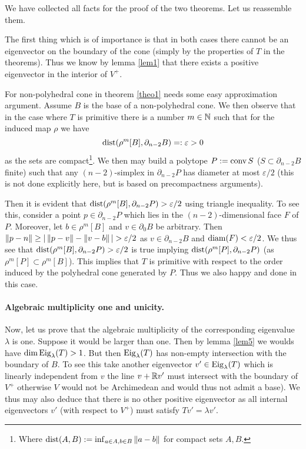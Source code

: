 \documentclass{article}
\begin{document}
We have collected all facts for the proof of the two theorems. Let us reassemble them.

The first thing which is of importance is that in both cases there cannot be an eigenvector on the boundary of the cone (simply by the properties of $T$ in the theorems). Thus we know by lemma \ref{lem1} that there exists a positive eigenvector in the interior of $V^+$. 

For non-polyhedral cone in theorem \ref{theo1} needs some easy approximation argument. Assume $B$ is the base of a non-polyhedral cone. We then observe that in the case where $T$ is primitive there is a number $m\in\mathbb{N}$ such that for the induced map $\rho$ we have 
\begin{equation}
\operatorname{dist}(\rho^m[B],\partial_{n-2}{B})=:\varepsilon>0
\end{equation}
as the sets are compact\footnote{Where $\operatorname{dist}(A,B):=\inf_{a\in A,b\in B}{\left\Vert a-b \right\Vert}$ for compact sets $A,B$.}. We then may build a polytope $P:=\operatorname{conv}{S}$ ($S\subset\partial_{n-2}{B}$ finite) such that any $(n-2)$-simplex in $\partial_{n-2}{P}$ has diameter at most $\varepsilon/2$ (this is not done explicitly here, but is based on precompactness arguments).

Then it is evident that $\operatorname{dist}(\rho^m[B],\partial_{n-2}{P})>\varepsilon/2$ using triangle inequality. To see this, consider a point $p\in\partial_{n-2}{P}$ which lies in the $(n-2)$-dimensional face $F$ of $P$. Moreover, let $b\in\rho^m[B]$ and $v\in\partial_0{B}$ be arbitrary. Then $\norm{p-n}\geq|\norm{p-v}-\norm{v-b}|>\varepsilon/2$ as $v\in \partial_{n-2}{B}$ and $\operatorname{diam}(F)<\varepsilon/2$. We thus see that $\operatorname{dist}(\rho^m[B],\partial_{n-2}{P})>\varepsilon/2$ is true implying $\operatorname{dist}(\rho^m[P],\partial_{n-2}{P})$ (as $\rho^m[P]\subset\rho^m[B]$). This implies that $T$ is primitive with respect to the order induced by the polyhedral cone generated by $P$. Thus we also happy and done in this case. 

\paragraph{Algebraic multiplicity one and unicity.} Now, let us prove that the algebraic multiplicity of the corresponding eigenvalue $\lambda$ is one. Suppose it would be larger than one. Then by lemma \ref{lem5} we woulds have $\dim\operatorname{Eig}_\lambda(T)>1$. But then $\operatorname{Eig}_\lambda(T)$ has non-empty intersection with the boundary of $B$. To see this take another eigenvector $v'\in\operatorname{Eig}_\lambda(T)$ which is linearly independent from $v$ the line $v+\mathbb{R} v'$ must intersect with the boundary of $V^+$ otherwise $V$ would not be Archimedean and would thus not admit a base). We thus may also deduce that there is no other positive eigenvector as all internal eigenvectors $v'$ (with respect to $V^+$) must satisfy $Tv'=\lambda v'$.
\end{document}
